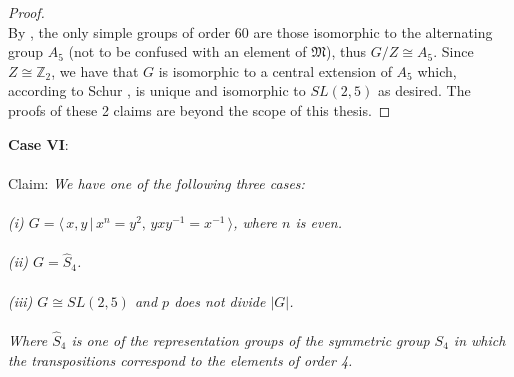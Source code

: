 \begin{proof}
\\
By \cite[p.145]{dummit}, the only simple groups of order 60 are those isomorphic to the alternating group $A_5$ (not to be confused with an element of $\mathfrak{M}$), thus $G / Z \cong A_5$. Since $Z \cong \mathbb{Z}_2$, we have that $G$ is isomorphic to a central extension of $A_5$ which, according to Schur \cite{schur}, is unique and isomorphic to $SL(2,5)$ as desired. The proofs of these 2 claims are beyond the scope of this thesis. \qedhere

\end{proof}

\textbf{Case VI}:\\
\\
Claim: \textit{We have one of the following three cases: \\
\\
(i) $G = \langle \, x,y \, | \, x^n = y^2, \, yxy^{-1} = x^{-1} \, \rangle$, where $n$ is even. \\
\\
(ii) $G = \widehat{S}_4$. \\
\\
(iii) $G \cong SL(2,5)$ and $p$ does not divide $|G|$. \\
\\
Where $\widehat{S}_4$ is one of the representation groups of the symmetric group $S_4$ in which the transpositions correspond to the elements of order 4.} \\

